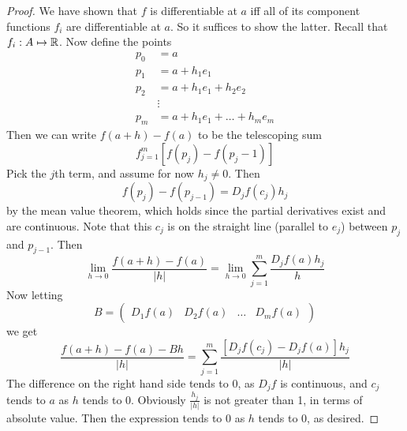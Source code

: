 \documentclass[12pt]{article}
\begin{document}
\begin{proof}
    We have shown that $f$ is differentiable at $a$ iff all of its component functions $f_i$ are differentiable at $a$. So it suffices to show the latter. Recall that $f_i:A\mapsto\mathbb{R}$. Now define the points
    \begin{align*}
        p_0 &= a \\
        p_1 &= a + h_1e_1 \\
        p_2 &= a + h_1e_1 + h_2e_2 \\
            &\vdots \\
        p_m &= a + h_1e_1 + \dots + h_me_m
    \end{align*}
    Then we can write $f(a+h) - f(a)$ to be the telescoping sum
    $$f_{j=1}^m [f(p_j) - f(p_j-1)]$$
    Pick the $j$th term, and assume for now $h_j \neq 0$. Then
    $$f(p_j) - f(p_{j-1}) = D_jf(c_j)h_j$$
    by the mean value theorem, which holds since the partial derivatives exist and are continuous. Note that this $c_j$ is on the straight line (parallel to $e_j$) between $p_j$ and $p_{j-1}$. Then
    $$\lim_{h\rightarrow0} \frac{f(a+h)-f(a)}{|h|} = \lim_{h\rightarrow0} \sum_{j=1}^m \frac{D_jf(a)h_j}{h}$$
    Now letting
    $$B = \begin{pmatrix} D_1f(a) & D_2f(a) & \dots & D_mf(a) \end{pmatrix}$$
    we get
    $$\frac{f(a+h) - f(a) - Bh}{|h|} = \sum_{j=1}^m \frac{[D_jf(c_j) - D_jf(a)]h_j}{|h|}$$
    The difference on the right hand side tends to 0, as $D_jf$ is continuous, and $c_j$ tends to $a$ as $h$ tends to 0. Obviously $\frac{h_j}{|h|}$ is not greater than 1, in terms of absolute value. Then the expression tends to 0 as $h$ tends to 0, as desired.
\end{proof}
\end{document}
